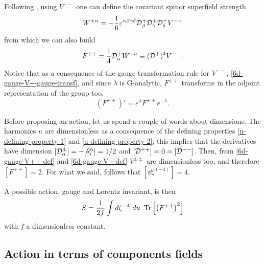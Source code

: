 Following \cite{Ivanov:2005qf}, using \( V^{--} \) one can define the covariant spinor superfield strength
\begin{equation}
W^{+\alpha}
	=
- \frac{1}{6}
\varepsilon^{ \alpha \beta \gamma \delta } 
{ \mathcal{D} }^+_\beta { \mathcal{D} }^+_\gamma { \mathcal{D} }^+_\delta V^{--}
\end{equation}
from which we can also build
\begin{equation}
F^{++} = \frac{1}{4} { \mathcal{D} }^+_a W^{+a} \equiv ({ \mathcal{D} }^+)^4 V^{--}.
\end{equation}
Notice that as a consequence of the gauge transformation rule for $V^{--}$, \eqref{6d-gauge-V---gauge-transf}, and since $\lambda$ is G-analytic, $F^{++}$ transforms in the adjoint representation of the group too, \ie
\begin{equation}
(F^{++})' = e^\lambda F^{++} e^{-\lambda}.
\end{equation}




Before proposing an action, let us spend a couple of words about dimensions. The harmonics $u$ are dimensionless as a consequence of the defining  properties \eqref{u-defining-property-1} and \eqref{u-defining-property-2}; this implies that the derivatives have dimension $[{ \mathcal{D} }^\pm_\alpha] = - [ \theta^\alpha_i ] = 1/2$ and $[{ \mathcal{D} }^{++}] = 0 = [{ \mathcal{D} }^{--}]$.  Then, from \eqref{6d-gauge-V++-def} and \eqref{6d-gauge-V---def} $V^{\pm\pm}$ are dimensionless too, and therefore $[F^{++}] = 2$. For what we said, follows that $[\dd{\zeta^{(-4)}}] = 4$.




A possible action, gauge and Lorentz invariant, is then
\begin{equation}\label{hd-action-superspace}
S = \frac{1}{2 f } \int d\zeta^{-4}\  du\  
	\operatorname{Tr} \left[ \left(  F^{++} \right)^2 \right]
\end{equation}
with $f$ a dimensionless constant.






\subsection{Action in terms of components fields}




